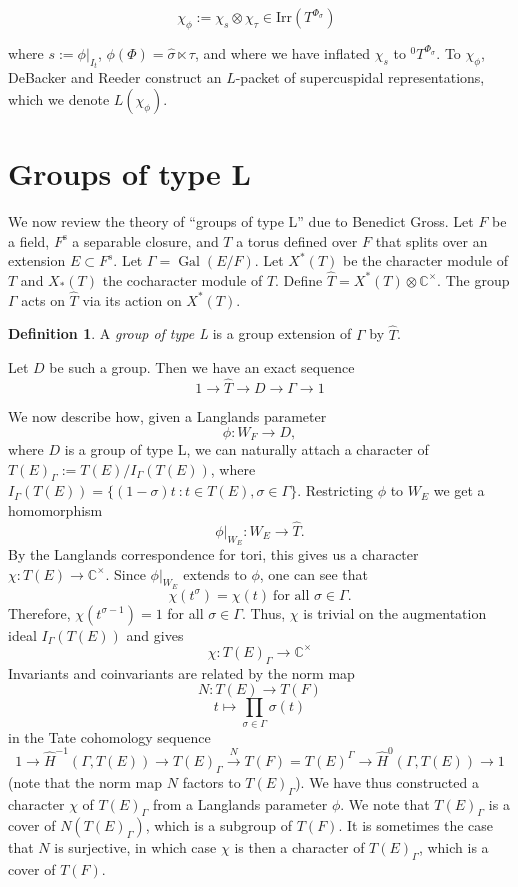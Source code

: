 \documentclass[11pt]{amsart}
\theoremstyle{plain}
\theoremstyle{definition}
\newtheorem{definition}[theorem]{Definition}
\DeclareMathOperator{\Gal}{Gal}
\begin{document}
\begin{equation}
\chi_{\phi} := \chi_s \otimes \chi_{\tau} \in \mathrm{Irr}(T^{\Phi_{\sigma}}) \ \ \label{chitau}
\end{equation}

\noindent where $s := \phi|_{I_t}$, $\phi(\Phi) = \hat{\sigma} \ltimes \tau$,
and where we have inflated $\chi_s$ to ${}^0 T^{\Phi_{\sigma}}$.  To
$\chi_{\phi}$, DeBacker and Reeder construct an $L$-packet of
supercuspidal representations, which we denote $L(\chi_{\phi})$.

\section{Groups of type L}\label{groupsoftypeL}
We now review the theory of ``groups of type L'' due to Benedict
Gross.  Let $F$ be a field, $F^{\mathrm s}$ a separable closure, and
$T$ a torus defined over $F$ that splits over an extension $E \subset
F^s$.  Let $\Gamma = \Gal(E/F)$.  Let $X^*(T)$ be the character module
of $T$ and $X_*(T)$ the cocharacter module of $T$.  Define
$\hat{T} = X^*(T) \otimes \mathbb{C}^\times$.  The group $\Gamma$ acts on
$\hat{T}$ via its action on $X^*(T)$.

\begin{definition}
A \emph{group of type L} is a group extension of $\Gamma$ by $\hat{T}$.
\end{definition}

Let $D$ be such a group.  Then we have an exact sequence
$$1 \rightarrow \hat{T} \rightarrow D \rightarrow \Gamma \rightarrow 1$$

We now describe how, given a Langlands parameter
$$\phi : W_F \rightarrow D,$$
where $D$ is a group of type L, we can naturally attach a character of
$T(E)_{\Gamma} := T(E) / I_{\Gamma}(T(E))$, where
$I_{\Gamma}(T(E)) = \{(1 - \sigma)t \ : t \in T(E), \sigma \in \Gamma \}$.
Restricting $\phi$ to $W_E$ we get a homomorphism
$$\phi|_{W_E} : W_E \rightarrow \hat{T}.$$
By the Langlands correspondence for tori, this gives us a character
$\chi : T(E) \rightarrow \mathbb{C}^\times$.  Since $\phi|_{W_E}$ extends
to $\phi$, one can see that
$$\chi(t^{\sigma}) = \chi(t)\ \mbox{for all $\sigma \in \Gamma$.}$$
Therefore, $\chi(t^{\sigma - 1}) = 1$ for all $\sigma \in \Gamma$.
Thus, $\chi$ is trivial on the augmentation ideal $I_{\Gamma}(T(E))$
and gives $$\chi : T(E)_\Gamma \rightarrow \mathbb{C}^\times$$ Invariants
and coinvariants are related by the norm map
$$N : T(E) \rightarrow T(F)$$ $$t \mapsto \displaystyle\prod_{\sigma \in \Gamma} \sigma(t)$$
in the Tate cohomology sequence
$$1 \rightarrow \hat{H}^{-1}(\Gamma,T(E)) \rightarrow T(E)_{\Gamma} \xrightarrow{N} T(F)
  = T(E)^{\Gamma} \rightarrow \hat{H}^0(\Gamma,T(E)) \rightarrow 1$$
(note that the norm map $N$ factors to $T(E)_{\Gamma}$).
We have thus constructed a character $\chi$ of $T(E)_{\Gamma}$ from a
Langlands parameter $\phi$. We note that $T(E)_{\Gamma}$ is a cover of
$N(T(E)_{\Gamma})$, which is a subgroup of $T(F)$.  It is sometimes
the case that $N$ is surjective, in which case $\chi$ is then a
character of $T(E)_{\Gamma}$, which is a cover of $T(F)$.
\end{document}
